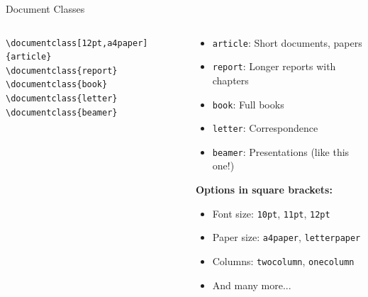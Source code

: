 \begin{frame}[fragile]{Document Classes}
    \begin{columns}
        \begin{column}{0.5\textwidth}
            \begin{lstlisting}
\documentclass[12pt,a4paper]{article}
\documentclass{report}
\documentclass{book}
\documentclass{letter}
\documentclass{beamer}
            \end{lstlisting}
        \end{column}
        
        \begin{column}{0.5\textwidth}
            \begin{itemize}
                \item \texttt{article}: Short documents, papers
                \item \texttt{report}: Longer reports with chapters
                \item \texttt{book}: Full books
                \item \texttt{letter}: Correspondence
                \item \texttt{beamer}: Presentations (like this one!)
            \end{itemize}
            
            \textbf{Options in square brackets:}
            \begin{itemize}
                \item Font size: \texttt{10pt}, \texttt{11pt}, \texttt{12pt}
                \item Paper size: \texttt{a4paper}, \texttt{letterpaper}
                \item Columns: \texttt{twocolumn}, \texttt{onecolumn}
                \item And many more...
            \end{itemize}
        \end{column}
    \end{columns}
\end{frame}

